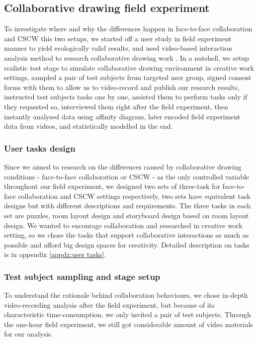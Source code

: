 \documentclass[12pt,twoside]{article}
\begin{document}
\subsection{Collaborative drawing field experiment}
\label{sect:collaborative}
To investigate where and why the differences happen in face-to-face collaboration and CSCW this two setups, we started off a user study in field experiment manner to yield ecologically valid results, and used video-based interaction analysis method to research collaborative drawing work \cite{charles1981conversational}\cite{heath1986body}. In a nutshell, we setup realistic test stage to simulate collaborative drawing environment in creative work settings, sampled a pair of test subjects from targeted user group, signed consent forms with them to allow us to video-record and publish our research results, instructed test subjects tasks one by one, assisted them to perform tasks only if they requested so, interviewed them right after the field experiment, then instantly analysed data using affinity diagram, later encoded field experiment data from videos, and statistically modelled in the end.

\subsubsection{User tasks design}

Since we aimed to research on the differences caused by collaborative drawing conditions - face-to-face collaboration or CSCW - as the only controlled variable throughout our field experiment, we designed two sets of three-task for face-to-face collaboration and CSCW settings respectively, two sets have equivalent task designs but with different descriptions and requirements. The three tasks in each set are puzzles, room layout design and storyboard design based on room layout design. We wanted to encourage collaboration and researched in creative work setting, so we chose the tasks that support collaborative interactions as much as possible and afford big design spaces for creativity. Detailed description on tasks is in appendix \ref{appdx:user tasks}. 

\subsubsection{Test subject sampling and stage setup}

To understand the rationale behind collaboration behaviours, we chose in-depth video-recording analysis after the field experiment, but because of its characteristic time-consumption, we only invited a pair of test subjects. Through the one-hour field experiment, we still got considerable amount of video materials for our analysis.
\end{document}
